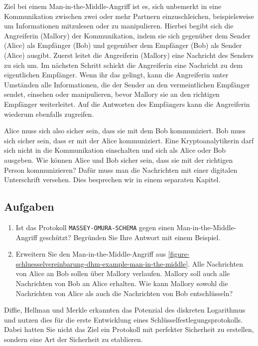 \begin{definition}
	Ziel bei einem Man-in-the-Middle-Angriff ist es, sich unbemerkt in eine Kommunikation zwischen zwei oder mehr Partnern einzuschleichen, beispielsweise um Informationen mitzulesen oder zu manipulieren. Hierbei begibt sich die Angreiferin (Mallory)  der Kommunikation, indem sie sich gegenüber dem Sender (Alice) als Empfänger (Bob) und gegenüber dem Empfänger (Bob) als Sender (Alice) ausgibt. Zuerst leitet die Angreiferin (Mallory) eine Nachricht des Senders zu sich um. Im nächsten Schritt schickt die Angreiferin eine Nachricht zu dem eigentlichen Empfänger. Wenn ihr das gelingt, kann die Angreiferin unter Umständen alle Informationen, die der Sender an den vermeintlichen Empfänger sendet, einsehen oder manipulieren, bevor Mallory sie an den richtigen Empfänger weiterleitet. Auf die Antworten des Empfängers kann die Angreiferin wiederum ebenfalls zugreifen.
\end{definition}

Alice muss sich also sicher sein, dass sie mit dem  Bob kommuniziert. Bob muss sich sicher sein, dass er mit der  Alice kommuniziert. Eine Kryptoanalytikerin darf sich nicht in die Kommunikation einschalten und sich als Alice oder Bob ausgeben. Wie können Alice und Bob sicher sein, dass sie mit der richtigen Person kommunizieren? Dafür muss man die Nachrichten mit einer digitalen Unterschrift versehen. Dies besprechen wir in einem separaten Kapitel.

\subsection{Aufgaben}

\begin{enumerate}
	\item Ist das Protokoll \texttt{MASSEY-OMURA-SCHEMA} gegen einen Man-in-the-Middle-Angriff geschützt? Begründen Sie Ihre Antwort mit einem Beispiel.
	\item Erweitern Sie den Man-in-the-Middle-Angriff aus \autoref{figure-schluesselvereinbarung-dhm-example-man-in-the-middle}. Alle Nachrichten von Alice an Bob sollen über Mallory verlaufen. Mallory soll auch alle Nachrichten von Bob an Alice erhalten. Wie kann Mallory sowohl die Nachrichten von Alice als auch die Nachrichten von Bob entschlüsseln?
\end{enumerate}

Diffie, Hellman und Merkle erkannten das Potenzial des diskreten Logarithmus und nutzen dies für die erste Entwicklung eines Schlüsselfestlegungsprotokolls. Dabei hatten Sie nicht das Ziel ein Protokoll mit perfekter Sicherheit zu erstellen, sondern eine  Art der Sicherheit zu etablieren.

